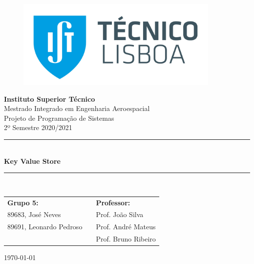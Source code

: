 \documentclass[a4paper, oneside, 11pt]{article}
\begin{document}
\begin{titlepage}
	\begin{center}
		\begin{figure}[htb!]
			\centering
			\includegraphics[width=10cm]{figures/istlogo.jpg}
		\end{figure}
        
        \LARGE{\textbf{Instituto Superior Técnico}}\\
        \vspace{20pt}
        \Large{Mestrado Integrado em Engenharia Aeroespacial}\\
        \vspace{10pt}
        \Large{Projeto de Programação de Sistemas}\\
        \vspace{10pt}
        \Large{2º Semestre 2020/2021}\\
            
        \vspace{40pt}
        \noindent\rule{16cm}{1pt}\\
        \Huge{\center \textbf{Key Value Store}}\\
        \noindent\rule{16cm}{1pt}\\
        
        \vspace{60pt}
        \large{\begin{tabular}{lll}
            \textbf{Grupo 5:} & \hspace{1.0cm}& \textbf{Professor:} \\
            89683, José Neves & \hspace{1.0cm}& Prof. João Silva \\
            89691, Leonardo Pedroso & \hspace{1.0cm} &Prof. André Mateus \\
            & \hspace{1.0cm} & Prof. Bruno Ribeiro\\
        \end{tabular}}
    
        \vspace{60pt}
        \large{\today}
	\end{center}
\end{titlepage}

\newpage
\renewcommand{\contentsname}{Índice}
\tableofcontents
\thispagestyle{empty}

\newpage
{}
\setcounter{page}{1}





\nocite{*}
\printbibliography
\end{document}
